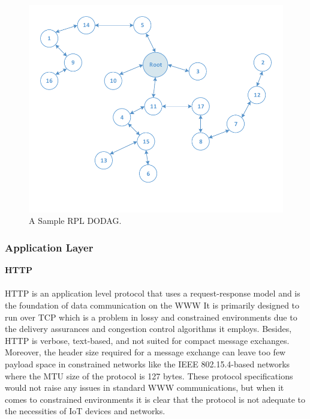 \documentclass{sig-alternate-05-2015}
\begin{document}
\begin{figure}[h]
  \centering
  \includegraphics[width=1.0\linewidth]{figures/RPL_DODAG.pdf}
  \caption{A Sample RPL DODAG.}
  \label{fig:rpl_dodag}
\end{figure}

\subsubsection{Application Layer}
\medskip
\textbf{\gls{HTTP}}\\\\
	\gls{HTTP} is an application level protocol that uses a request-response model and is the foundation of data communication on the \gls{WWW} It is primarily designed to run over \gls{TCP} which is a problem in lossy and constrained environments due to the delivery assurances and congestion control algorithms it employs. Besides, {HTTP} is verbose, text-based, and not suited for compact message exchanges. Moreover, the header size required for a message exchange can leave too few payload space in constrained networks like the IEEE 802.15.4-based networks where the \gls{MTU} size of the protocol is 127 bytes. These protocol specifications would not raise any issues in standard \gls{WWW} communications, but when it comes to constrained environments it is clear that the protocol is not adequate to the necessities of \gls{IoT} devices and networks.\\
\end{document}
